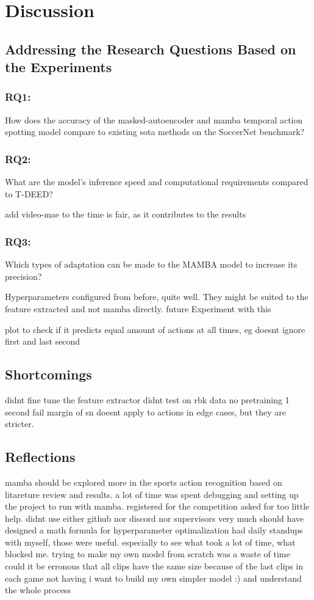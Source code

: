 \chapter{Discussion}
\label{chap:discussion}

\section{Addressing the Research Questions Based on the Experiments}


\subsection{RQ1:} 
How does the accuracy of the masked-autoencoder and mamba temporal action spotting model compare to existing \acrlong{sota} methods on the SoccerNet benchmark?
\subsection{RQ2:} 
What are the model’s inference speed and computational requirements compared to T-DEED?

add video-mae to the time is fair, as it contributes to the results
\subsection{RQ3:}
Which types of adaptation can be made to the MAMBA model to increase its precision?

Hyperparameters configured from before, quite well. 
They might be suited to the feature extracted and not mamba directly. 
future Experiment with this


plot to check if it predicts equal amount of actions at all times, eg doesnt ignore first and last second 

\section{Shortcomings}
didnt fine tune the feature extractor
didnt test on rbk data
no pretraining
1 second fail margin of sn doesnt apply to actions in edge cases, but they are stricter. 

\section{Reflections}
mamba should be explored more in the sports action recognition based on litareture review and results. 
a lot of time was spent debugging and setting up the project to run with mamba. 
registered for the competition
asked for too little help. didnt use either github nor discord nor supervisors very much
should have designed a math formula for hyperparameter optimalization
had daily standups with myself, those were useful. especially to see what took a lot of time, what blocked me.
trying to make my own model from scratch was a waste of time
could it be erronous that all clips have the same size because of the last clips in each game not having
i want to build my own simpler model :) and understand the whole process

